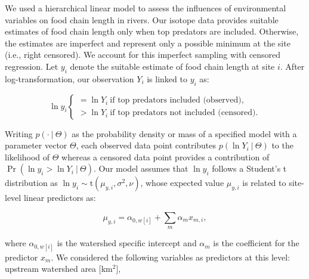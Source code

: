 \documentclass[11pt, class=article, crop=false]{standalone}
\begin{document}
We used a hierarchical linear model to assess the influences of environmental variables on food chain length in rivers.
Our isotope data provides suitable estimates of food chain length only when top predators are included.
Otherwise, the estimates are imperfect and represent only a possible minimum at the site (i.e., right censored).
We account for this imperfect sampling with censored regression.
Let $y_i$ denote the suitable estimate of food chain length at site $i$.
After log-transformation, our observation $Y_i$ is linked to $y_i$ as:

\begin{equation}
    \ln y_i 
    \begin{cases}
        = \ln Y_i~\text{if top predators included (observed)},\\
        > \ln Y_i~\text{if top predators not included (censored).}
    \end{cases}
\end{equation}

Writing $p(\cdot~|~\Theta)$ as the probability density or mass of a specified model with a parameter vector $\Theta$, each observed data point contributes $p(\ln Y_i~|~\Theta)$ to the likelihood of $\Theta$ whereas a censored data point provides a contribution of $\Pr(\ln y_i > \ln Y_i~|~\Theta)$.
Our model assumes that $\ln y_i$ follows a Student's t distribution as $\ln y_i \sim \mbox{t}(\mu_{y,i}, \sigma^2, \nu)$, whose expected value $\mu_{y,i}$ is related to site-level linear predictors as:

\begin{equation}
    \mu_{y,i} = \alpha_{0, w[i]} + \sum_m \alpha_m x_{m,i},
\end{equation}

where $\alpha_{0, w[i]}$ is the watershed specific intercept and $\alpha_m$ is the coefficient for the predictor $x_m$.
We considered the following variables as predictors at this level: upstream watershed area [km$^2$], 
\end{document}
